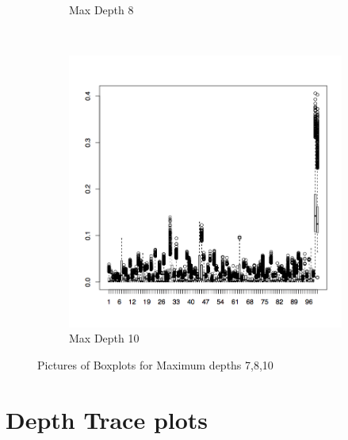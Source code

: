 \documentclass{article}
\begin{document}
\begin{figure}[H]
\begin{subfigure}[b]{0.3\textwidth}
                \caption{Max Depth 8}
                \label{fig:tiger}
        \end{subfigure}
        ~ %
        \begin{subfigure}[b]{0.3\textwidth}
                \centering
                \includegraphics[width=\textwidth]{c10_boxp}
                \caption{Max Depth 10}
                \label{fig:mouse}
        \end{subfigure}
        \caption{Pictures of Boxplots for Maximum depths 7,8,10}\label{fig:Boxplots78_10 }
\end{figure}


\section{Depth Trace plots}
\end{document}
